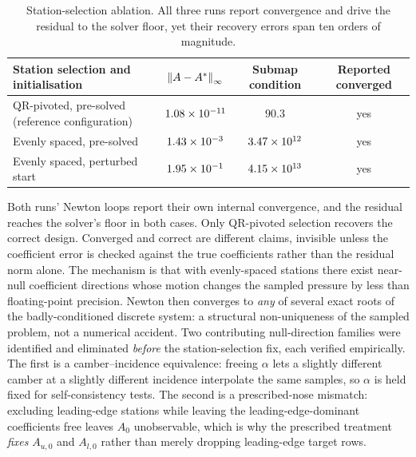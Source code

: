 \begin{table}[htbp]
\centering
\caption{Station-selection ablation. All three runs report convergence and
drive the residual to the solver floor, yet their recovery errors span ten
orders of magnitude.}
\label{tab:identifiability}
\begin{tabularx}{\textwidth}{@{}L c c c@{}}
\toprule
Station selection and initialisation & $\left\|A-A^\ast\right\|_\infty$ & Submap condition & Reported converged \\
\midrule
QR-pivoted, pre-solved (reference configuration) & $1.08\times10^{-11}$ & $90.3$ & yes \\
Evenly spaced, pre-solved & $1.43\times10^{-3}$ & $3.47\times10^{12}$ & yes \\
Evenly spaced, perturbed start & $1.95\times10^{-1}$ & $4.15\times10^{13}$ & yes \\
\bottomrule
\end{tabularx}
\end{table}

Both runs' Newton loops report their own internal convergence, and the
residual reaches the solver's floor in both cases. Only QR-pivoted selection
recovers the correct design. Converged and correct are different claims,
invisible unless the coefficient error is checked against the true
coefficients rather than the residual norm alone. The mechanism is that with
evenly-spaced stations there exist near-null coefficient directions whose
motion changes the sampled pressure by less than floating-point precision.
Newton then converges to \emph{any} of several exact roots of the
badly-conditioned discrete system: a structural non-uniqueness of the sampled
problem, not a numerical accident. Two contributing null-direction families
were identified and eliminated \emph{before} the station-selection fix, each
verified empirically. The first is a camber--incidence equivalence: freeing
$\alpha$ lets a slightly different camber at a slightly different incidence
interpolate the same samples, so $\alpha$ is held fixed for self-consistency
tests. The second is a prescribed-nose mismatch: excluding leading-edge
stations while leaving the leading-edge-dominant coefficients free leaves
$A_0$ unobservable, which is why the prescribed treatment \emph{fixes}
$A_{u,0}$ and $A_{l,0}$ rather than merely dropping leading-edge target rows.

